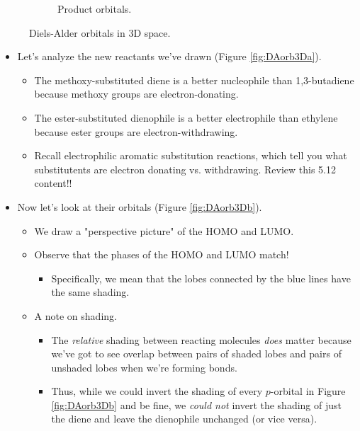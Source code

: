 \documentclass[../notes.tex]{subfiles}
\begin{document}
\begin{itemize}
\begin{figure}[h!]
\begin{subfigure}[b]{0.3\linewidth}
            \caption{Product orbitals.}
            \label{fig:DAorb3Dc}
        \end{subfigure}
        \caption{Diels-Alder orbitals in 3D space.}
        \label{fig:DAorb3D}
    \end{figure}
    \pagebreak
    \begin{itemize}
        \item Let's analyze the new reactants we've drawn (Figure \ref{fig:DAorb3Da}).
        \begin{itemize}
            \item The methoxy-substituted diene is a better nucleophile than 1,3-butadiene because methoxy groups are electron-donating.
            \item The ester-substituted dienophile is a better electrophile than ethylene because ester groups are electron-withdrawing.
            \item Recall electrophilic aromatic substitution reactions, which tell you what substitutents are electron donating vs. withdrawing. Review this 5.12 content!!
        \end{itemize}
        \item Now let's look at their orbitals (Figure \ref{fig:DAorb3Db}).
        \begin{itemize}
            \item We draw a "perspective picture" of the HOMO and LUMO.
            \item Observe that the phases of the HOMO and LUMO match!
            \begin{itemize}
                \item Specifically, we mean that the lobes connected by the blue lines have the same shading.
            \end{itemize}
            \item A note on shading.
            \begin{itemize}
                \item The \emph{relative} shading between reacting molecules \emph{does} matter because we've got to see overlap between pairs of shaded lobes and pairs of unshaded lobes when we're forming bonds.
                \item Thus, while we could invert the shading of every $p$-orbital in Figure \ref{fig:DAorb3Db} and be fine, we \emph{could not} invert the shading of just the diene and leave the dienophile unchanged (or vice versa).

\end{itemize}
\end{itemize}
\end{itemize}
\end{itemize}
\end{document}
